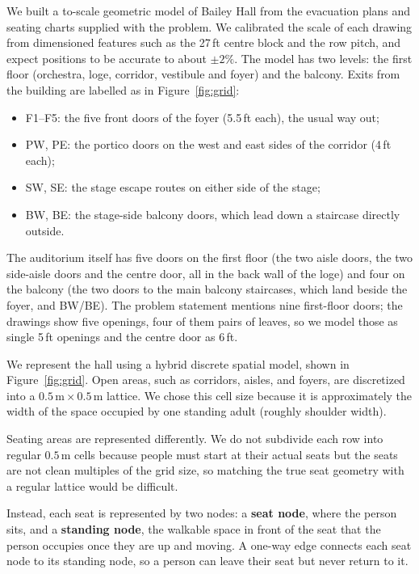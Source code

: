 \documentclass{article}
\begin{document}
We built a to-scale geometric model of Bailey Hall from the evacuation plans and seating charts supplied with the problem. We calibrated the scale of each drawing from dimensioned features such as the 27\,ft centre block and the row pitch, and expect positions to be accurate to about $\pm 2\%$. The model has two levels: the first floor (orchestra, loge, corridor, vestibule and foyer) and the balcony. Exits from the building are labelled as in Figure~\ref{fig:grid}:
\begin{itemize}
    \item F1--F5: the five front doors of the foyer (5.5\,ft each), the usual way out;
    \item PW, PE: the portico doors on the west and east sides of the corridor (4\,ft each);
    \item SW, SE: the stage escape routes on either side of the stage;
    \item BW, BE: the stage-side balcony doors, which lead down a staircase directly outside.
\end{itemize}
The auditorium itself has five doors on the first floor (the two aisle doors, the two side-aisle doors and the centre door, all in the back wall of the loge) and four on the balcony (the two doors to the main balcony staircases, which land beside the foyer, and BW/BE). The problem statement mentions nine first-floor doors; the drawings show five openings, four of them pairs of leaves, so we model those as single 5\,ft openings and the centre door as 6\,ft.

We represent the hall using a hybrid discrete spatial model, shown in Figure~\ref{fig:grid}. Open areas, such as corridors, aisles, and foyers, are discretized into a $0.5\,\text{m} \times 0.5\,\text{m}$ lattice. We chose this cell size because it is approximately the width of the space occupied by one standing adult (roughly shoulder width).

Seating areas are represented differently. We do not subdivide each row into regular $0.5\,\text{m}$ cells because people must start at their actual seats but the seats are not clean multiples of the grid size, so matching the true seat geometry with a regular lattice would be difficult.

Instead, each seat is represented by two nodes: a \textbf{seat node}, where the person sits, and a \textbf{standing node}, the walkable space in front of the seat that the person occupies once they are up and moving. A one-way edge connects each seat node to its standing node, so a person can leave their seat but never return to it.
\end{document}
